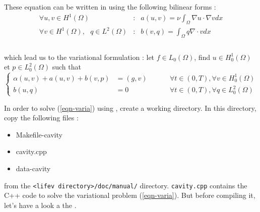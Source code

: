 These equation can be written in using the following bilinear forms :
\begin{eqnarray*}
\displaystyle \forall u,v \in H^1(\Omega) & : &
a(u,v) = \nu \int_{\Omega}\nabla u \cdot \nabla v dx \\
\displaystyle \forall v \in H^1(\Omega),\mbox{ } q \in L^2(\Omega) & : &
b(v,q) = \int_{\Omega} q\nabla \cdot v dx \\
\end{eqnarray*}\\
which lead us to the variational formulation : let $f
\in L_0(\Omega)$, find $u \in H^1_0(\Omega)$ et $p \in
L^2_0(\Omega)$ such that
\begin{equation} \label{eqn-varia}
\left\{
\begin{array}{rlr}
\displaystyle \alpha (u,v) + a(u,v) + b(v,p) & =  (g,v)
& \hspace{1cm} \forall t \in(0,T), \forall v \in H^1_0(\Omega) \\
b(u,q) & = 0 & \hspace{1cm} \forall t \in (0,T), \forall q \in L^2_0(\Omega)
\end{array}
\right.
\end{equation}

In order to solve (\ref{eqn-varia}) using \lifev, create a working directory.
In this directory, copy the following files :

\begin{itemize}
\item Makefile-cavity
\item cavity.cpp
\item data-cavity
\end{itemize}

from the \verb|<lifev directory>/doc/manual/| directory. \verb!cavity.cpp! contains the
C++ code to solve the variational problem (\ref{eqn-varia}). But before compiling it,
let's have a look a the .

